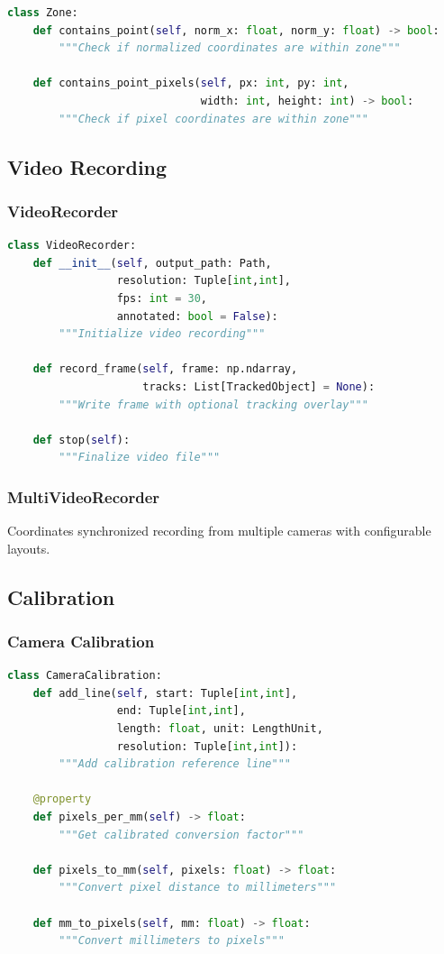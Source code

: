 \documentclass[11pt,a4paper]{article}
\begin{document}
\begin{lstlisting}[language=Python]
class Zone:
    def contains_point(self, norm_x: float, norm_y: float) -> bool:
        """Check if normalized coordinates are within zone"""

    def contains_point_pixels(self, px: int, py: int,
                              width: int, height: int) -> bool:
        """Check if pixel coordinates are within zone"""
\end{lstlisting}

\subsection{Video Recording}

\subsubsection{VideoRecorder}

\begin{lstlisting}[language=Python]
class VideoRecorder:
    def __init__(self, output_path: Path,
                 resolution: Tuple[int,int],
                 fps: int = 30,
                 annotated: bool = False):
        """Initialize video recording"""

    def record_frame(self, frame: np.ndarray,
                     tracks: List[TrackedObject] = None):
        """Write frame with optional tracking overlay"""

    def stop(self):
        """Finalize video file"""
\end{lstlisting}

\subsubsection{MultiVideoRecorder}

Coordinates synchronized recording from multiple cameras with configurable layouts.

\subsection{Calibration}

\subsubsection{Camera Calibration}

\begin{lstlisting}[language=Python]
class CameraCalibration:
    def add_line(self, start: Tuple[int,int],
                 end: Tuple[int,int],
                 length: float, unit: LengthUnit,
                 resolution: Tuple[int,int]):
        """Add calibration reference line"""

    @property
    def pixels_per_mm(self) -> float:
        """Get calibrated conversion factor"""

    def pixels_to_mm(self, pixels: float) -> float:
        """Convert pixel distance to millimeters"""

    def mm_to_pixels(self, mm: float) -> float:
        """Convert millimeters to pixels"""
\end{lstlisting}
\end{document}
